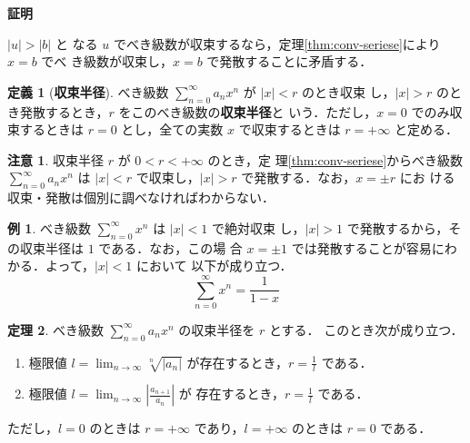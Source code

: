 \documentclass[10pt, uplatex, dvipdfmx]{jsarticle}
\makeatletter
\renewenvironment{proof}[1][\proofname]{\par
  \pushQED{\qed}%
  \normalfont \topsep6\p@\@plus6\p@\relax
  \trivlist
  \item\relax
  {\bfseries
  #1\@addpunct{.}}\hspace\labelsep\ignorespaces
}{%
  \popQED\endtrivlist\@endpefalse
}
\theoremstyle{definition}
\newtheorem{theorem}{定理}[section]
\newtheorem*{definition}{定義}
\newtheorem{example}[theorem]{例}
\newtheorem*{remark}{注意}
\renewcommand{\proofname}{\textbf{証明}}
\numberwithin{equation}{section}
\newcommand{\ds}{\displaystyle}
\makeatother
\begin{document}
\begin{proof}
$|u|> |b|$ と
なる $u$ でべき級数が収束するなら，定理\ref{thm:conv-seriese}により $x=b$ でべ
き級数が収束し，$x=b$ で発散することに矛盾する．
\end{proof}


\begin{definition}[\textbf{収束半径}]
  べき級数 $\ds \sum_{n=0}^{\infty} a_n x^n$ が $|x| < r$ のとき収束
  し，$|x|>r$ のとき発散するとき，$r$ をこのべき級数の\textbf{収束半径}と
  いう．ただし，$x=0$ でのみ収束するときは $r=0$ とし，全ての実数 $x$
  で収束するときは $r=+\infty$ と定める．
\end{definition}


\begin{remark}
  収束半径 $r$ が $0 < r < +\infty$ のとき，定
  理\ref{thm:conv-seriese}からべき級数 $\ds \sum_{n=0}^{\infty} a_n
  x^n$ は $|x| <r$ で収束し，$|x|>r$ で発散する．なお，$x= \pm r$ にお
  ける収束・発散は個別に調べなければわからない．
\end{remark}


\begin{example}\label{exmp:geo}
  べき級数 $\ds \sum_{n=0}^{\infty} x^n$ は $|x|<1$ で絶対収束
  し，$|x|>1$ で発散するから，その収束半径は $1$ である．なお，この場
  合 $x=\pm1$ では発散することが容易にわかる．よって，$|x|<1$ において
  以下が成り立つ．
  \[
    \sum_{n=0}^{\infty}x^n=\frac{1}{1-x}
  \]
\end{example}

\begin{theorem}\label{thm:criterion}
  べき級数 $\ds \sum_{n=0}^{\infty} a_n x^n$ の収束半径を $r$ とする．
  このとき次が成り立つ．
  \begin{enumerate}[(1)]
    \setlength{\itemsep}{1zh}
  \item 極限値 $\ds l = \lim_{n \to \infty} \sqrt[n]{|a_n|}$ が存在するとき，$\ds r=\frac{1}{l}$ である．
  \item 極限値
    $\ds l = \lim_{n \to \infty} \left| \frac{a_{n+1}}{a_n}\right|$ が
    存在するとき，$\ds r=\frac{1}{l}$ である．
  \end{enumerate}
  ただし，$l=0$ のときは $r=+\infty$ であり，$l=+\infty$ のときは $r=0$ である．
\end{theorem}
\end{document}
